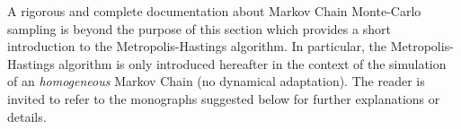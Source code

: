 \renewcommand{\etapemethodo}{B}
\renewcommand{\nomfichier}{docref_B21_MetropolisHastings}
\renewcommand{\titrefiche}{The Metropolis-Hastings Algorithm}

\Header

A rigorous and complete documentation about Markov Chain Monte-Carlo sampling is beyond the purpose
of this section which provides a short introduction to the Metropolis-Hastings algorithm.
In particular, the Metropolis-Hastings algorithm is only introduced hereafter
in the context of the simulation of an \emph{homogeneous} Markov Chain (no dynamical
adaptation).
The reader is invited to refer to the monographs suggested below for further explanations or details.

